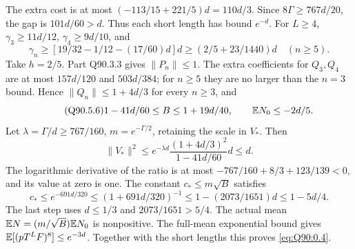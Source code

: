 The extra cost is at most \((-113/15+221/5)d=\allowbreak 110d/3\).
Since \(8\Gamma\ge\allowbreak 767d/20\), the gap is \(101d/60>\allowbreak d\).
Thus each short length has bound \(e^{-d}\).
For \(L\ge\allowbreak 4\), \(\gamma_3\ge\allowbreak 11d/12\), \(\gamma_4\ge\allowbreak 9d/10\), and
\begin{equation}\tag{Q90.5.5}\label{eq:Q90:5.5}
\gamma_n\ge[19/32-1/12-(17/60)d]d
\ge(2/5+23/1440)d\quad(n\ge5).
\end{equation}
Take \(h=\allowbreak 2/5\). Part Q90.3.3 gives \(\|P_n\|\le\allowbreak 1\).
The extra coefficients for \(Q_3,\allowbreak Q_4\) are at most \(157d/120\)
and \(503d/384\); for \(n\ge\allowbreak 5\) they are no larger than the
\(n=\allowbreak 3\) bound. Hence \(\|Q_n\|\le\allowbreak 1+4d/3\) for every \(n\ge\allowbreak 3\), and
\begin{equation}\tag{Q90.5.6}\label{eq:Q90:5.6}
1-41d/60\le B\le1+19d/40,\qquad\mathbb E N_0\le-2d/5.
\end{equation}
Let \(\lambda=\allowbreak \Gamma/d\ge\allowbreak 767/160\), \(m=\allowbreak e^{-\Gamma/2}\), retaining
the scale in \(V_*\). Then
\begin{equation}\tag{Q90.5.7}\label{eq:Q90:5.7}
\|V_*\|^2\le e^{-\lambda d}
\frac{(1+4d/3)^2}{1-41d/60}d\le d.
\end{equation}
The logarithmic derivative of the ratio is at most
\(-767/160+8/3+123/139<\allowbreak 0\), and its value at zero is one.
The constant \(c_*\le\allowbreak  m\sqrt B\) satisfies
\begin{equation}\tag{Q90.5.8}\label{eq:Q90:5.8}
c_*\le e^{-691d/320}\le(1+691d/320)^{-1}
\le1-(2073/1651)d\le1-5d/4.
\end{equation}
The last step uses \(d\le\allowbreak 1/3\) and \(2073/1651>\allowbreak 5/4\).
The actual mean \(\mathbb E N=\allowbreak (m/\sqrt B)\mathbb E N_0\) is nonpositive.
The full-mean exponential bound gives \(\mathbb E[(pT^LF)^8]\le\allowbreak  e^{-3d}\).
Together with the short lengths this proves \eqref{eq:Q90:0.4}.


